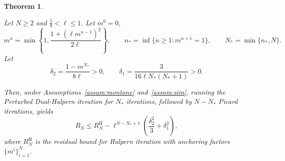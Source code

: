 \documentclass[pdflatex,sn-mathphys-num]{sn-jnl}%
\newcommand{\NN}{\mathbb{N}}
\theoremstyle{thmstyleone}%
\newtheorem{theorem}{Theorem}%
\theoremstyle{thmstyletwo}%
\theoremstyle{thmstylethree}%
\begin{document}
\begin{theorem}
\label{thm:perturbed-dual-halpern}

Let $N \ge 2$ and $\frac{5}{8}<\ell\le 1$.
Let $m^0=0$, 
\[m^n=\min\left\{1,\frac{1+(\ell m^{n-1})^2}{2\ell}\right\}, \qquad  n_*=\inf\{n\ge 1:m^{n+1}=1\}, \qquad N_*=\min\{n_*,N\}.\]
Let
 \[\delta_{2}= \frac{1-m^{N_*}}{8\ell }>0, \qquad \delta_1=\frac{3}{16\ell N_*(N_*+1)}>0.\]


Then, under Assumptions~\ref{assum:montone} and~\ref{assum:sim}, running the Perturbed Dual-Halpern iteration for $N_*$ iterations, followed by $N-N_*$ Picard iterations, yields
\[ R_N \le R_N^{\mathrm H} -\ell^{N-N_*+1}\left(\frac{\delta_2^2}{3}+\delta_1^2\right),\]
where $R_N^{\mathrm H}$ is the residual bound for Halpern iteration with anchoring factors $\{m^i\}^N_{i=1}$.
\end{theorem}
\end{document}
